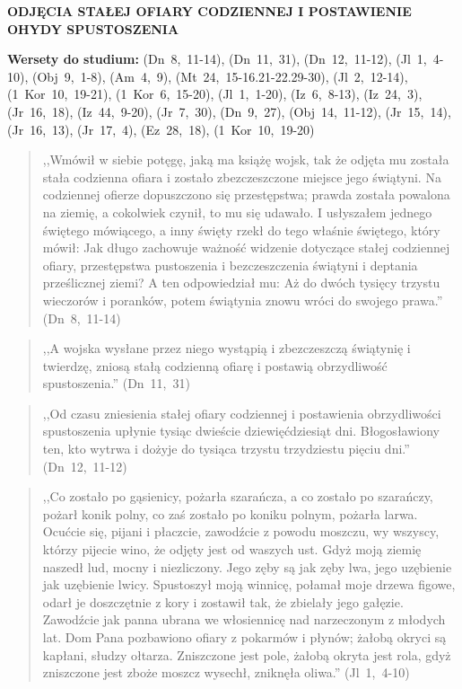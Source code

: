\documentclass[10pt,a4paper,oneside]{article}
\begin{document}
\centerline{\textbf{\MakeUppercase{Odjęcia stałej ofiary codziennej i postawienie ohydy spustoszenia}}}
\begin{center}
\textbf{Wersety do studium:} \mbox{(Dn 8, 11-14)}, \mbox{(Dn 11, 31)}, \mbox{(Dn 12, 11-12)}, \mbox{(Jl 1, 4-10)}, \mbox{(Obj 9, 1-8)}, \mbox{(Am 4, 9)}, \mbox{(Mt 24, 15-16.21-22.29-30)}, \mbox{(Jl 2, 12-14)}, \mbox{(1 Kor 10, 19-21)}, \mbox{(1 Kor 6, 15-20)}, \mbox{(Jl 1, 1-20)}, \mbox{(Iz 6, 8-13)}, \mbox{(Iz 24, 3)}, \mbox{(Jr 16, 18)}, \mbox{(Iz 44, 9-20)}, \mbox{(Jr 7, 30)}, \mbox{(Dn 9, 27)}, \mbox{(Obj 14, 11-12)}, \mbox{(Jr 15, 14)}, \mbox{(Jr 16, 13)}, \mbox{(Jr 17, 4)}, \mbox{(Ez 28, 18)}, \mbox{(1 Kor 10, 19-20)}
\end{center}
\begin{quote}
,,Wmówił w siebie potęgę, jaką ma książę wojsk, tak że odjęta mu została stała codzienna ofiara i zostało zbezczeszczone miejsce jego świątyni. Na codziennej ofierze dopuszczono się przestępstwa; prawda została powalona na ziemię, a cokolwiek czynił, to mu się udawało. I usłyszałem jednego świętego mówiącego, a inny święty rzekł do tego właśnie świętego, który mówił: Jak długo zachowuje ważność widzenie dotyczące stałej codziennej ofiary, przestępstwa pustoszenia i bezczeszczenia świątyni i deptania prześlicznej ziemi? A ten odpowiedział mu: Aż do dwóch tysięcy trzystu wieczorów i poranków, potem świątynia znowu wróci do swojego prawa.'' \mbox{(Dn 8, 11-14)}
\end{quote}
\begin{quote}
,,A wojska wysłane przez niego wystąpią i zbezczeszczą świątynię i twierdzę, zniosą stałą codzienną ofiarę i postawią obrzydliwość spustoszenia.'' \mbox{(Dn 11, 31)}
\end{quote}
\begin{quote}
,,Od czasu zniesienia stałej ofiary codziennej i postawienia obrzydliwości spustoszenia upłynie tysiąc dwieście dziewięćdziesiąt dni. Błogosławiony ten, kto wytrwa i dożyje do tysiąca trzystu trzydziestu pięciu dni.'' \mbox{(Dn 12, 11-12)}
\end{quote}
\begin{quote}
,,Co zostało po gąsienicy, pożarła szarańcza, a co zostało po szarańczy, pożarł konik polny, co zaś zostało po koniku polnym, pożarła larwa. Ocućcie się, pijani i płaczcie, zawodźcie z powodu moszczu, wy wszyscy, którzy pijecie wino, że odjęty jest od waszych ust. Gdyż moją ziemię naszedł lud, mocny i niezliczony. Jego zęby są jak zęby lwa, jego uzębienie jak uzębienie lwicy. Spustoszył moją winnicę, połamał moje drzewa figowe, odarł je doszczętnie z kory i zostawił tak, że zbielały jego gałęzie. Zawodźcie jak panna ubrana we włosiennicę nad narzeczonym z młodych lat. Dom Pana pozbawiono ofiary z pokarmów i płynów; żałobą okryci są kapłani, słudzy ołtarza. Zniszczone jest pole, żałobą okryta jest rola, gdyż zniszczone jest zboże moszcz wysechł, zniknęła oliwa.'' \mbox{(Jl 1, 4-10)}
\end{quote}
\end{document}
